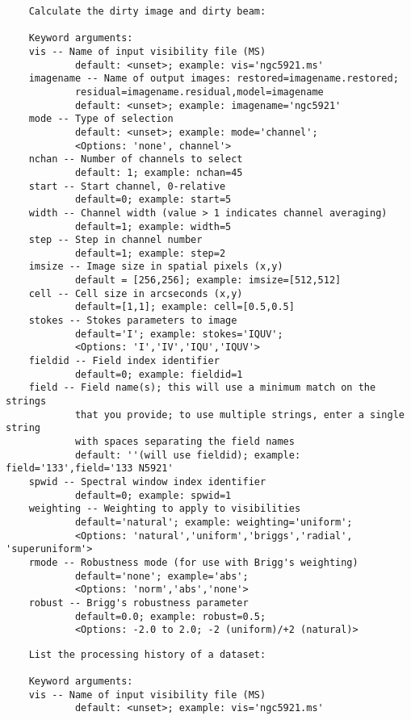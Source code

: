 \vspace{3mm}
\small
\begin{verbatim}
    Calculate the dirty image and dirty beam:
    
    Keyword arguments:
    vis -- Name of input visibility file (MS)
            default: <unset>; example: vis='ngc5921.ms'
    imagename -- Name of output images: restored=imagename.restored;
            residual=imagename.residual,model=imagename
            default: <unset>; example: imagename='ngc5921'
    mode -- Type of selection 
            default: <unset>; example: mode='channel'; 
            <Options: 'none', channel'>
    nchan -- Number of channels to select
            default: 1; example: nchan=45
    start -- Start channel, 0-relative
            default=0; example: start=5
    width -- Channel width (value > 1 indicates channel averaging)
            default=1; example: width=5
    step -- Step in channel number
            default=1; example: step=2      
    imsize -- Image size in spatial pixels (x,y)
            default = [256,256]; example: imsize=[512,512]
    cell -- Cell size in arcseconds (x,y)
            default=[1,1]; example: cell=[0.5,0.5]
    stokes -- Stokes parameters to image
            default='I'; example: stokes='IQUV'; 
            <Options: 'I','IV','IQU','IQUV'>
    fieldid -- Field index identifier
            default=0; example: fieldid=1
    field -- Field name(s); this will use a minimum match on the strings
            that you provide; to use multiple strings, enter a single string
            with spaces separating the field names
            default: ''(will use fieldid); example: field='133',field='133 N5921'
    spwid -- Spectral window index identifier
            default=0; example: spwid=1
    weighting -- Weighting to apply to visibilities
            default='natural'; example: weighting='uniform'; 
            <Options: 'natural','uniform','briggs','radial', 'superuniform'>
    rmode -- Robustness mode (for use with Brigg's weighting)
            default='none'; example='abs'; 
            <Options: 'norm','abs','none'>
    robust -- Brigg's robustness parameter 
            default=0.0; example: robust=0.5; 
            <Options: -2.0 to 2.0; -2 (uniform)/+2 (natural)>
\end{verbatim}
\normalsize

\vspace{3mm}
\small
\begin{verbatim}
    List the processing history of a dataset:
    
    Keyword arguments:
    vis -- Name of input visibility file (MS)
            default: <unset>; example: vis='ngc5921.ms'
\end{verbatim}
\normalsize

